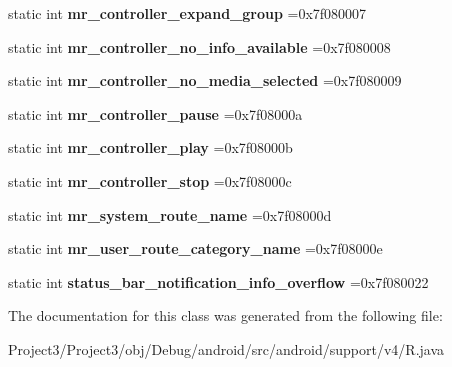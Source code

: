 \begin{DoxyCompactItemize}
static int {\bfseries mr\+\_\+controller\+\_\+expand\+\_\+group} =0x7f080007
\item 
\mbox{\label{classandroid_1_1support_1_1v4_1_1R_1_1string_a6b294cea6ef7fa3da35e3cf928be752d}} 
static int {\bfseries mr\+\_\+controller\+\_\+no\+\_\+info\+\_\+available} =0x7f080008
\item 
\mbox{\label{classandroid_1_1support_1_1v4_1_1R_1_1string_a1dc204c54b6402f14b14a577bc49e922}} 
static int {\bfseries mr\+\_\+controller\+\_\+no\+\_\+media\+\_\+selected} =0x7f080009
\item 
\mbox{\label{classandroid_1_1support_1_1v4_1_1R_1_1string_a0552b33bc8ea4655f53a816fb2f7d053}} 
static int {\bfseries mr\+\_\+controller\+\_\+pause} =0x7f08000a
\item 
\mbox{\label{classandroid_1_1support_1_1v4_1_1R_1_1string_adf5168304211f9e5b4ab37fafd14582e}} 
static int {\bfseries mr\+\_\+controller\+\_\+play} =0x7f08000b
\item 
\mbox{\label{classandroid_1_1support_1_1v4_1_1R_1_1string_ac26e5189f5350129dcb7edd3aa27a3da}} 
static int {\bfseries mr\+\_\+controller\+\_\+stop} =0x7f08000c
\item 
\mbox{\label{classandroid_1_1support_1_1v4_1_1R_1_1string_abf3325200163889c06cc5744ceab5fd1}} 
static int {\bfseries mr\+\_\+system\+\_\+route\+\_\+name} =0x7f08000d
\item 
\mbox{\label{classandroid_1_1support_1_1v4_1_1R_1_1string_aad5c92b9d4bb51a26be87b03f39d5749}} 
static int {\bfseries mr\+\_\+user\+\_\+route\+\_\+category\+\_\+name} =0x7f08000e
\item 
\mbox{\label{classandroid_1_1support_1_1v4_1_1R_1_1string_a06ff2214c5b583bde99ad6c78da682f3}} 
static int {\bfseries status\+\_\+bar\+\_\+notification\+\_\+info\+\_\+overflow} =0x7f080022
\end{DoxyCompactItemize}


The documentation for this class was generated from the following file\+:\begin{DoxyCompactItemize}
\item 
Project3/\+Project3/obj/\+Debug/android/src/android/support/v4/R.\+java\end{DoxyCompactItemize}
